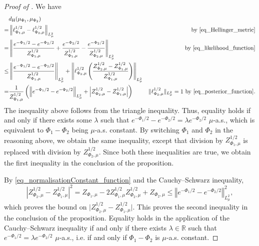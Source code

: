 \documentclass[a4paper]{scrartcl}
\theoremstyle{definition}
\numberwithin{equation}{section}
\newcommand{\R}{\mathbb{R}}
\newcommand{\abs}[1]{\vert #1\vert}
\newcommand{\Abs}[1]{\left\vert#1\right\vert}
\newcommand{\norm}[1]{\Vert #1 \Vert}
\newcommand{\Norm}[1]{\left\Vert #1 \right\Vert}
\newcommand{\Hel}[0]{\textup{H}}
\begin{document}
\HellingerboundsMisfitperturbationsTriangle*
\begin{proof}[Proof of ]
We have
 \begin{align*}
  &d_{\Hel}(\mu_{\Phi_1},\mu_{\Phi_2})
  \\
  = &\Norm{\ell_{\Phi_1,\mu}^{1/2}-\ell_{\Phi_2,\mu}^{1/2}}_{L^2_\mu} & \text{by \eqref{eq_Hellinger_metric}}
  \\
  =& \Norm{\frac{e^{-\Phi_1/2}-e^{-\Phi_2/2}}{Z_{\Phi_1,\mu}^{1/2}}+\frac{e^{-\Phi_2/2}}{Z_{\Phi_1,\mu}^{1/2}}-\frac{e^{-\Phi_2/2}}{Z_{\Phi_2,\mu}^{1/2}}}_{L^2_\mu} & \text{by \eqref{eq_likelihood_function}}
  \\
  \leq & \Norm{\frac{e^{-\Phi_1/2}-e^{-\Phi_2/2}}{Z_{\Phi_1,\mu}^{1/2}}}_{L^2_\mu}+\Norm{\ell_{\Phi_2,\mu}^{1/2}\left(\frac{Z_{\Phi_2,\mu}^{1/2}-Z_{\Phi_1,\mu}^{1/2}}{Z_{\Phi_1,\mu}^{1/2}}\right)}_{L^2_\mu}
  \\
  =&\frac{1}{Z_{\Phi_1,\mu}^{1/2}}\left( \Norm{e^{-\Phi_1/2}-e^{-\Phi_2/2}}_{L^2_\mu}+\Abs{Z_{\Phi_2,\mu}^{1/2}-Z_{\Phi_1,\mu}^{1/2}}\right) & \text{$\norm{\ell_{\Phi_2,\mu}^{1/2}}_{L^2_\mu}=1$ by \eqref{eq_posterior_function}.}
  \end{align*}
  The inequality above follows from the triangle inequality.
  Thus, equality holds if and only if there exists some $\lambda$ such that $e^{-\Phi_1/2}-e^{-\Phi_2/2}=\lambda e^{-\Phi_2/2}$ $\mu$-a.s., which is equivalent to $\Phi_1-\Phi_2$ being $\mu$-a.s. constant.
By switching $\Phi_1$ and $\Phi_2$ in the reasoning above, we obtain the same inequality, except that division by $Z_{\Phi_1,\mu}^{1/2}$ is replaced with division by $Z_{\Phi_2,\mu}^{1/2}$. 
Since both these inequalities are true, we obtain the first inequality in the conclusion of the proposition.
  
  By \eqref{eq_normalisationConstant_function} and the Cauchy--Schwarz inequality,
  \begin{equation*}
  \Abs{Z_{\Phi_2,\mu}^{1/2}-Z_{\Phi_1,\mu}^{1/2}}^2=Z_{\Phi_1,\mu}-2Z_{\Phi_1,\mu}^{1/2} Z_{\Phi_2,\mu}^{1/2}+Z_{\Phi_2,\mu}\leq  \Norm{e^{-\Phi_1/2}-e^{-\Phi_2/2}}_{L^2_\mu}^2,
  \end{equation*}
  which proves the bound on $\abs{Z_{\Phi_2,\mu}^{1/2}-Z_{\Phi_1,\mu}^{1/2}}$.
  This proves the second inequality in the conclusion of the proposition.
  Equality holds in the application of the Cauchy--Schwarz inequality if and only if there exists $\lambda\in\R$ such that $e^{-\Phi_1/2}=\lambda e^{-\Phi_2/2}$ $\mu$-a.s., i.e. if and only if $\Phi_1-\Phi_2$ is $\mu$-a.s. constant.
  

\end{proof}
\end{document}

